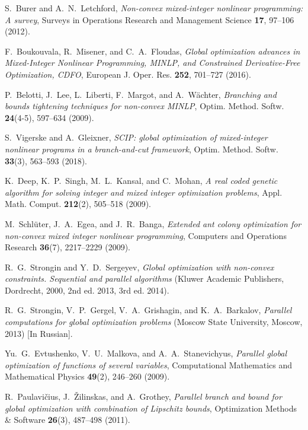 \documentclass[
11pt,%
tightenlines,%
twoside,%
onecolumn,%
nofloats,%
nobibnotes,%
nofootinbib,%
superscriptaddress,%
noshowpacs,%
centertags]%
{revtex4}
\begin{document}
%
%

\begin{thebibliography}{99}

S.~Burer and A.~N.~Letchford, \textit{Non-convex mixed-integer nonlinear programming: A survey}, Surveys in Operations Research and Management Science \textbf{17}, 97--106 (2012).

F.~Boukouvala, R.~Misener, and C.~A.~Floudas, \textit{Global
optimization advances in Mixed-Integer Nonlinear Programming, MINLP,
and Constrained Derivative-Free Optimization, CDFO}, European J.
Oper. Res. \textbf{252}, 701--727 (2016).

P.~Belotti, J.~Lee, L.~Liberti, F.~Margot, and A.~W\"achter,
\textit{Branching and bounds tightening techniques for non-convex
MINLP}, Optim. Method. Softw. \textbf{24}(4-5), 597--634 (2009).

S.~Vigerske and A.~Gleixner, \textit{SCIP: global optimization of mixed-integer nonlinear programs in a branch-and-cut framework}, Optim. Method. Softw. \textbf{33}(3), 563--593 (2018).

K.~Deep, K.~P.~Singh, M.~L.~Kansal, and C.~Mohan, \textit{A real
coded genetic algorithm for solving integer and mixed integer
optimization problems}, Appl. Math. Comput. \textbf{212}(2),
505--518 (2009).

M.~Schl\"uter, J.~A.~Egea, and J.~R.~Banga, \textit{Extended ant
colony optimization for non-convex mixed integer nonlinear
programming}, Computers and Operations Research \textbf{36}(7),
2217--2229 (2009).

R.~G.~Strongin and Y.~D.~Sergeyev, \textit{Global optimization with non-convex constraints. Sequential and parallel algorithms} (Kluwer Academic Publishers, Dordrecht, 2000, 2nd ed. 2013, 3rd ed. 2014).

R.~G.~Strongin, V.~P.~Gergel, V.~A.~Grishagin, and K.~A.~Barkalov,
\textit{Parallel computations for global optimization problems}
(Moscow State University, Moscow, 2013) [In Russian].

Yu.~G.~Evtushenko, V.~U.~Malkova, and A.~A.~Stanevichyus,
\textit{Parallel global optimization of functions of several
variables}, Computational Mathematics and Mathematical Physics
\textbf{49}(2), 246--260 (2009).

R.~Paulavi\v{c}ius, J.~\v{Z}ilinskas, and A.~Grothey,
\textit{Parallel branch and bound for global optimization with
combination of Lipschitz bounds}, Optimization Methods \& Software
\textbf{26}(3), 487--498 (2011).


\end{thebibliography}
\end{document}
